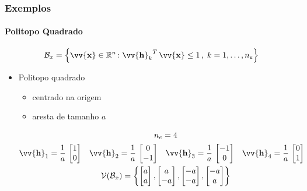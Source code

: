 \documentclass{beamer}
\newcommand*{\Curly}[1]{\left\{#1\right\}}
\newcommand*{\Set}[1]{\Curly{#1}}
\newcommand*{\Prod}{\,}
\newcommand*{\Bold}[1]{\boldsymbol{\mathbf{#1}}}
\newcommand*{\Vect}[1]{\vv{\Bold{#1}}}
\newcommand*{\Transp}[1]{{#1}^{T}}
\renewcommand{\Prod}{\,}
\begin{document}
\begin{frame}\frametitle{Exemplos}\framesubtitle{Politopo Quadrado}
  \begin{equation}
    \mathcal{B}_x
    = \Set{\Vect{x} \in \mathbb{R}^n \colon \Transp{\Vect{h}_k} \Prod \Vect{x} \leq 1 \,,\; k = 1, \dotsc, n_e}
  \end{equation}
  \begin{itemize}
    \item Politopo quadrado
    \begin{itemize}
      \item centrado na origem
      \item aresta de tamanho $a$
    \end{itemize}
    \begin{gather}
      n_e = 4
      \\
      \begin{aligned}
        \Vect{h}_1 &= \frac{1}{a} \Prod \begin{bmatrix} 1 \\ 0 \end{bmatrix}
        &
        \Vect{h}_2 &= \frac{1}{a} \Prod \begin{bmatrix} 0 \\ -1 \end{bmatrix}
        &
        \Vect{h}_3 &= \frac{1}{a} \Prod \begin{bmatrix} -1 \\ 0 \end{bmatrix}
        &
        \Vect{h}_4 &= \frac{1}{a} \Prod \begin{bmatrix} 0 \\ 1 \end{bmatrix}
      \end{aligned}
      \\
      \mathcal{V}(\mathcal{B}_x) = \left\{
      \begin{bmatrix} a \\ a \end{bmatrix}
      ,
      \begin{bmatrix} a \\ -a \end{bmatrix}
      ,
      \begin{bmatrix} -a \\ -a \end{bmatrix}
      ,
      \begin{bmatrix} -a \\ a \end{bmatrix}
      \right\}
    \end{gather}
  \end{itemize}
\end{frame}
\end{document}
